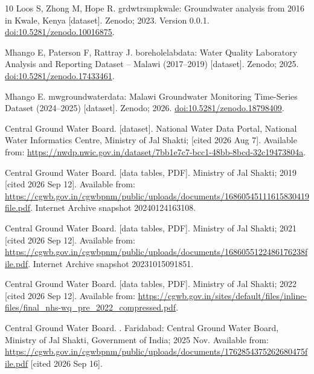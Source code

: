 \documentclass[10pt,letterpaper]{article}
\begin{document}
\begin{thebibliography}{10}
{Loos} S, {Zhong} M, {Hope} R. {grdwtrsmpkwale: Groundwater analysis from 2016
  in Kwale, Kenya} [dataset]. Zenodo; 2023.
\newblock Version 0.0.1.
\newblock \href {http://dx.doi.org/10.5281/zenodo.10016875}
  {doi:10.5281/zenodo.10016875}.

{Mhango} E, {Paterson} F, {Rattray} J. {boreholelabdata: Water Quality
  Laboratory Analysis and Reporting Dataset -- Malawi (2017--2019)} [dataset].
  Zenodo; 2025.
\newblock \href {http://dx.doi.org/10.5281/zenodo.17433461}
  {doi:10.5281/zenodo.17433461}.

{Mhango} E. {mwgroundwaterdata: Malawi Groundwater Monitoring Time-Series
  Dataset (2024--2025)} [dataset]. Zenodo; 2026.
\newblock \href {http://dx.doi.org/10.5281/zenodo.18798409}
  {doi:10.5281/zenodo.18798409}.

{Central Ground Water Board}.
 [dataset]. National Water Data Portal, National Water
  Informatics Centre, Ministry of Jal Shakti; [cited 2026 Aug 7].
\newblock Available from:
  \url{https://nwdp.nwic.gov.in/dataset/7bb1e7c7-bcc1-48bb-8bcd-32c19473804a}.

{Central Ground Water Board}.
 [data tables, PDF]. Ministry of
  Jal Shakti; 2019 [cited 2026 Sep 12].
\newblock Available from:
  \url{https://cgwb.gov.in/cgwbpnm/public/uploads/documents/16860545111615830419file.pdf}.
\newblock Internet Archive snapshot 20240124163108.

{Central Ground Water Board}.
 [data tables, PDF]. Ministry of
  Jal Shakti; 2021 [cited 2026 Sep 12].
\newblock Available from:
  \url{https://cgwb.gov.in/cgwbpnm/public/uploads/documents/1686055122486176238file.pdf}.
\newblock Internet Archive snapshot 20231015091851.

{Central Ground Water Board}.
 [data tables, PDF]. Ministry of Jal Shakti; 2022 [cited
  2026 Sep 12].
\newblock Available from:
  \url{https://cgwb.gov.in/sites/default/files/inline-files/final_nhs-wq_pre_2022_compressed.pdf}.

{Central Ground Water Board}.
.
\newblock Faridabad: Central Ground Water Board, Ministry of Jal Shakti,
  Government of India; 2025 Nov.
\newblock Available from:
  \url{https://cgwb.gov.in/cgwbpnm/public/uploads/documents/1762854375262680475file.pdf}
  [cited 2026 Sep 16].


\end{thebibliography}
\end{document}
